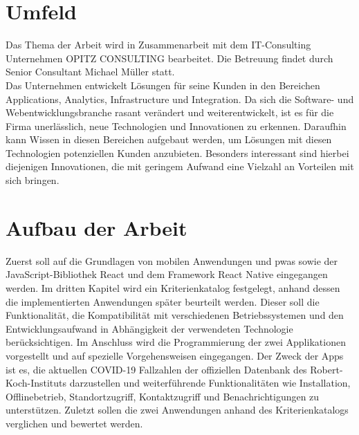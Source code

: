 \section{Umfeld}
Das Thema der Arbeit wird in Zusammenarbeit mit dem IT-Consulting Unternehmen OPITZ CONSULTING bearbeitet.
Die Betreuung findet durch Senior Consultant Michael Müller statt.\\
Das Unternehmen entwickelt Lösungen für seine Kunden in den Bereichen Applications, Analytics, Infrastructure und Integration.
Da sich die Software- und Webentwicklungsbranche rasant verändert und weiterentwickelt, ist es für die Firma unerlässlich, neue Technologien und Innovationen zu erkennen.
Daraufhin kann Wissen in diesen Bereichen aufgebaut werden, um Lösungen mit diesen Technologien potenziellen Kunden anzubieten.
Besonders interessant sind hierbei diejenigen Innovationen, die mit geringem Aufwand eine Vielzahl an Vorteilen mit sich bringen.

\section{Aufbau der Arbeit}
Zuerst soll auf die Grundlagen von mobilen Anwendungen und \acp{pwa} sowie der JavaScript-Bibliothek React und dem Framework React Native eingegangen werden.
Im dritten Kapitel wird ein Kriterienkatalog festgelegt, anhand dessen die implementierten Anwendungen später beurteilt werden.
Dieser soll die Funktionalität, die Kompatibilität mit verschiedenen Betriebssystemen und den Entwicklungsaufwand in Abhängigkeit der verwendeten Technologie berücksichtigen.
Im Anschluss wird die Programmierung der zwei Applikationen vorgestellt und auf spezielle Vorgehensweisen eingegangen.
Der Zweck der Apps ist es, die aktuellen COVID-19 Fallzahlen der offiziellen Datenbank des Robert-Koch-Instituts darzustellen und weiterführende Funktionalitäten wie Installation, Offlinebetrieb, Standortzugriff, Kontaktzugriff und Benachrichtigungen zu unterstützen.
Zuletzt sollen die zwei Anwendungen anhand des Kriterienkatalogs verglichen und bewertet werden.